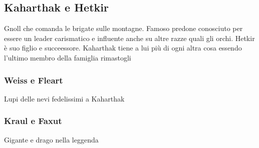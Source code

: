 \documentclass[10pt,twoside,twocolumn]{article}
\begin{document}
\subsection{Kaharthak e Hetkir}\label{char:kaharthak}
Gnoll che comanda le brigate sulle montagne. Famoso predone conosciuto per essere
un leader carismatico e influente anche su altre razze quali gli orchi.
Hetkir \`e suo figlio e succeessore. Kaharthak tiene a lui pi\`u di ogni altra cosa
essendo l'ultimo membro della famiglia rimastogli
\subsubsection{Weiss e Fleart}\label{char:weiss}
Lupi delle nevi fedelissimi a Kaharthak
\subsubsection{Kraul e Faxut}\label{char:kraul}
Gigante e drago nella leggenda
\end{document}

